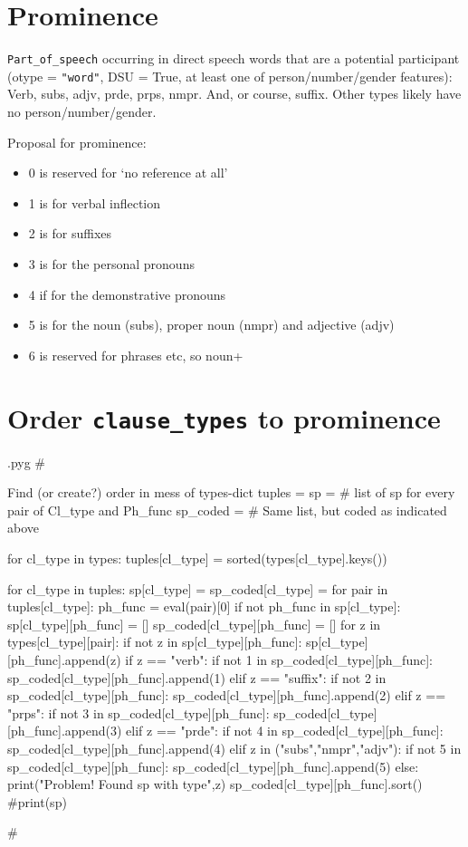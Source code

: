 \documentclass{report}
\makeatletter
\newcommand{\mi}[1]{\lstinline{#1}}
\newenvironment{python}{%
  \VerbatimEnvironment
  \minted@resetoptions
  \setkeys{minted@opt}{}
      \begin{VerbatimOut}{\jobname.pyg}}
{%
      \end{VerbatimOut}
      \minted@pygmentize{python}
      \DeleteFile{\jobname.pyg}}
\makeatother
\begin{document}
\section{Prominence}
\mi{Part_of_speech} occurring in direct speech words that are a potential participant (otype = \mi{"word"}, DSU = True, at least one of person/number/gender features):
Verb, subs, adjv, prde, prps, nmpr. And, or course, suffix.
Other types likely have no person/number/gender.

Proposal for prominence:
\begin{itemize}
\item 0 is reserved for `no reference at all'
\item 1 is for verbal inflection
\item 2 is for suffixes
\item 3 is for the personal pronouns
\item 4 if for the demonstrative pronouns
\item 5 is for the noun (subs), proper noun (nmpr) and adjective (adjv)
\item 6 is reserved for phrases etc, so noun+
\end{itemize}

\section{Order \mi{clause_types} to prominence}
\begin{python}
#{{{ Find (or create?) order in mess of types-dict
tuples = {}
sp = {} # list of sp for every pair of Cl_type and Ph_func
sp_coded = {}   # Same list, but coded as indicated above

for cl_type in types:
    tuples[cl_type] = sorted(types[cl_type].keys())

for cl_type in tuples:
    sp[cl_type] = {}
    sp_coded[cl_type] = {}
    for pair in tuples[cl_type]:
        ph_func = eval(pair)[0]
        if not ph_func in sp[cl_type]:
            sp[cl_type][ph_func] = []
            sp_coded[cl_type][ph_func] = []
        for z in types[cl_type][pair]:
            if not z in sp[cl_type][ph_func]:
                sp[cl_type][ph_func].append(z)
                if z == "verb":
                    if not 1 in sp_coded[cl_type][ph_func]:
                        sp_coded[cl_type][ph_func].append(1)
                elif z == "suffix":
                    if not 2 in sp_coded[cl_type][ph_func]:
                        sp_coded[cl_type][ph_func].append(2)
                elif z == "prps":
                    if not 3 in sp_coded[cl_type][ph_func]:
                        sp_coded[cl_type][ph_func].append(3)
                elif z == "prde":
                    if not 4 in sp_coded[cl_type][ph_func]:
                        sp_coded[cl_type][ph_func].append(4)
                elif z in ("subs","nmpr","adjv"):
                    if not 5 in sp_coded[cl_type][ph_func]:
                        sp_coded[cl_type][ph_func].append(5)
                else:
                    print("Problem! Found sp with type",z)
        sp_coded[cl_type][ph_func].sort()
#print(sp)

#}}}
\end{python}
\end{document}
